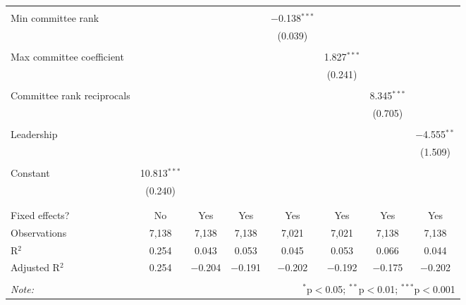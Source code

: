 \documentclass{article}
\begin{document}
\begin{table}[!htbp]
{{\begin{tabular}{@{\extracolsep{5pt}}lccccccc}
          & & & & & & & \\ 
         Min committee rank &  &  &  & $-$0.138$^{***}$ &  &  &  \\ 
          &  &  &  & (0.039) &  &  &  \\ 
          & & & & & & & \\ 
         Max committee coefficient &  &  &  &  & 1.827$^{***}$ &  &  \\ 
          &  &  &  &  & (0.241) &  &  \\ 
          & & & & & & & \\ 
         Committee rank reciprocals &  &  &  &  &  & 8.345$^{***}$ &  \\ 
          &  &  &  &  &  & (0.705) &  \\ 
          & & & & & & & \\ 
         Leadership &  &  &  &  &  &  & $-$4.555$^{**}$ \\ 
          &  &  &  &  &  &  & (1.509) \\ 
          & & & & & & & \\ 
         Constant & 10.813$^{***}$ &  &  &  &  &  &  \\ 
          & (0.240) &  &  &  &  &  &  \\ 
          & & & & & & & \\ 
        \hline \\[-1.8ex] 
        Fixed effects? & No & Yes & Yes & Yes & Yes & Yes & Yes \\ 
        Observations & 7,138 & 7,138 & 7,138 & 7,021 & 7,021 & 7,138 & 7,138 \\ 
        R$^{2}$ & 0.254 & 0.043 & 0.053 & 0.045 & 0.053 & 0.066 & 0.044 \\ 
        Adjusted R$^{2}$ & 0.254 & $-$0.204 & $-$0.191 & $-$0.202 & $-$0.192 & $-$0.175 & $-$0.202 \\ 
        \hline 
        \hline \\[-1.8ex] 
        \textit{Note:}  & \multicolumn{7}{r}{$^{*}$p$<$0.05; $^{**}$p$<$0.01; $^{***}$p$<$0.001} \\ 
        \end{tabular} 
    }}
  \end{table} 
\end{document}
